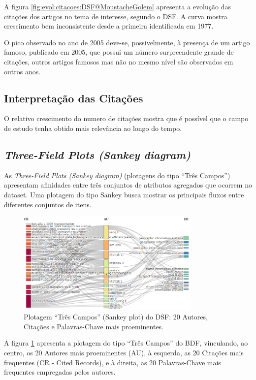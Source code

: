 A figura \ref{fig:evol:citacoes:DSF@MoustacheGolem} apresenta a evolução das citações dos artigos no tema de interesse, segundo o DSF. A curva mostra  crescimento bem inconsistente  desde a primeira identificada em 1977.

O pico observado no ano de 2005 deve-se, possivelmente, à presença de um artigo famoso, publicado em 2005, que possui um número surpreendente grande de citações, outros artigos famosos mas não no mesmo nível  são observados em outros anos. 

\subsection{Interpretação das Citações}
O relativo crescimento do numero de citações mostra que é possível que o campo de estudo tenha obtido mais relevância ao longo do tempo.
\subsection{\textit{Three-Field Plots (Sankey diagram)}}

As \textit{Three-Field Plots (Sankey diagram)} (plotagens do tipo ``Três Campos'') apresentam afinidades entre três conjuntos de atributos agregados que ocorrem no dataset. Uma plotagem do tipo Sankey busca mostrar os principais fluxos entre diferentes conjuntos de itens. 

\begin{figure}
    \centering
    \includegraphics[angle=0,width=0.8\textwidth]{experiments/MoustacheGolem/T1/img3ThreeFieldsPlot.PNG}%
    \caption{Plotagem ``Três Campos'' (Sankey plot) do DSF: 20 Autores, Citações e Palavras-Chave mais proeminentes.}
    \label{fig:ThreeFieldPlot:DSF@MoustacheGolem}
\end{figure}


A figura \ref{fig:ThreeFieldPlot:DSF@MoustacheGolem} apresenta a plotagem do tipo ``Três Campos'' do BDF, vinculando, ao centro, os 20 Autores mais proeminentes (AU), à esquerda, as 20 Citações mais frequentes (CR - Cited Records), e à direita, as 20 Palavras-Chave mais frequentes empregadas pelos autores.

